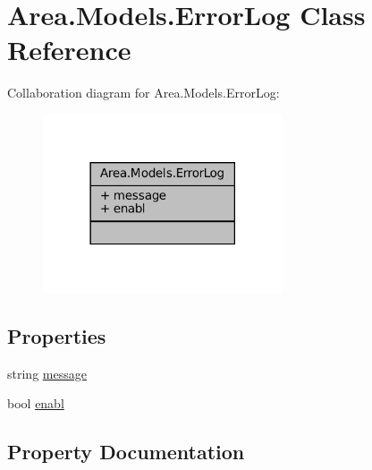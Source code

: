 \hypertarget{classArea_1_1Models_1_1ErrorLog}{}\section{Area.\+Models.\+Error\+Log Class Reference}
\label{classArea_1_1Models_1_1ErrorLog}


Collaboration diagram for Area.\+Models.\+Error\+Log\+:
\nopagebreak
\begin{figure}[H]
\begin{center}
\leavevmode
\includegraphics[width=201pt]{classArea_1_1Models_1_1ErrorLog__coll__graph}
\end{center}
\end{figure}
\subsection*{Properties}
\begin{DoxyCompactItemize}
\item 
string \mbox{\hyperlink{classArea_1_1Models_1_1ErrorLog_a0a2f2fc766e51324db7b7157c72f73cc}{message}}
\item 
bool \mbox{\hyperlink{classArea_1_1Models_1_1ErrorLog_afc1deffe6377c972754eef679ce05473}{enabl}}
\end{DoxyCompactItemize}


\subsection{Property Documentation}
\mbox{\label{classArea_1_1Models_1_1ErrorLog_afc1deffe6377c972754eef679ce05473}} 
